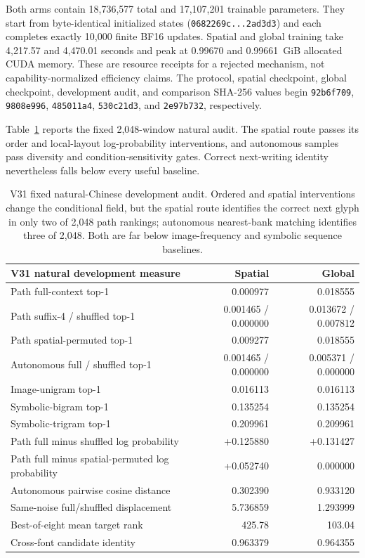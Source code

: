 \documentclass[11pt]{article}
\begin{document}
Both arms contain 18,736,577 total and 17,107,201 trainable parameters. They
start from byte-identical initialized states
(\texttt{0682269c...2ad3d3}) and each completes exactly 10,000 finite BF16
updates. Spatial and global training take 4,217.57 and 4,470.01 seconds and peak
at 0.99670 and 0.99661~GiB allocated CUDA memory. These are resource receipts
for a rejected mechanism, not capability-normalized efficiency claims. The
protocol, spatial checkpoint, global checkpoint, development audit, and
comparison SHA-256 values begin \texttt{92b6f709}, \texttt{9808e996},
\texttt{485011a4}, \texttt{530c21d3}, and \texttt{2e97b732}, respectively.

Table~\ref{tab:v31natural} reports the fixed 2,048-window natural audit. The
spatial route passes its order and local-layout log-probability interventions,
and autonomous samples pass diversity and condition-sensitivity gates. Correct
next-writing identity nevertheless falls below every useful baseline.

\begin{table}[h!]
\centering
\footnotesize
\begin{tabular}{lrr}
\toprule
V31 natural development measure & Spatial & Global \\
\midrule
Path full-context top-1 & 0.000977 & 0.018555 \\
Path suffix-4 / shuffled top-1 & 0.001465 / 0.000000 & 0.013672 / 0.007812 \\
Path spatial-permuted top-1 & 0.009277 & 0.018555 \\
Autonomous full / shuffled top-1 & 0.001465 / 0.000000 & 0.005371 / 0.000000 \\
Image-unigram top-1 & 0.016113 & 0.016113 \\
Symbolic-bigram top-1 & 0.135254 & 0.135254 \\
Symbolic-trigram top-1 & 0.209961 & 0.209961 \\
Path full minus shuffled log probability & +0.125880 & +0.131427 \\
Path full minus spatial-permuted log probability & +0.052740 & 0.000000 \\
Autonomous pairwise cosine distance & 0.302390 & 0.933120 \\
Same-noise full/shuffled displacement & 5.736859 & 1.293999 \\
Best-of-eight mean target rank & 425.78 & 103.04 \\
Cross-font candidate identity & 0.963379 & 0.964355 \\
\bottomrule
\end{tabular}
\caption{V31 fixed natural-Chinese development audit. Ordered and spatial
interventions change the conditional field, but the spatial route identifies
the correct next glyph in only two of 2,048 path rankings; autonomous
nearest-bank matching identifies three of 2,048. Both are far below
image-frequency and symbolic sequence baselines.}
\label{tab:v31natural}
\end{table}
\end{document}
